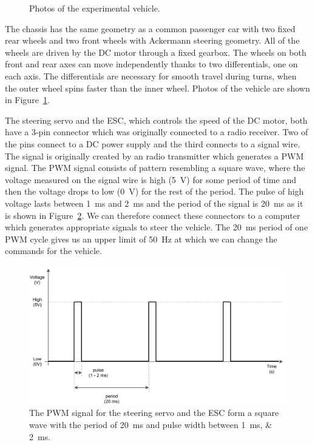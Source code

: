 \begin{figure}[!tbp]
	\label{fig:chassis}
	\caption{Photos of the experimental vehicle.}
\end{figure}

The chassis has the same geometry as a common passenger car with two fixed rear wheels and two front wheels with Ackermann steering geometry. All of the wheels are driven by the \gls*{DC} motor through a fixed gearbox. The wheels on both front and rear axes can move independently thanks to two differentials, one on each axis. The differentials are necessary for smooth travel during turns, when the outer wheel spins faster than the inner wheel. Photos of the vehicle are shown in Figure~\ref{fig:chassis}.

The steering servo and the \gls*{ESC}, which controls the speed of the \gls*{DC} motor, both have a 3-pin connector which was originally connected to a radio receiver. Two of the pins connect to a \gls*{DC} power supply and the third connects to a signal wire. The signal is originally created by an radio transmitter which generates a \gls{PWM} signal. The \gls*{PWM} signal consists of pattern resembling a square wave, where the voltage measured on the signal wire is high (\SI{5}{\volt}) for some period of time and then the voltage drops to low (\SI{0}{\volt}) for the rest of the period. The pulse of high voltage lasts between \SI{1}{\milli\second} and \SI{2}{\milli\second} and the period of the signal is \SI{20}{\milli\second} as it is shown in Figure~\ref{fig:pwm}. We can therefore connect these connectors to a computer which generates appropriate signals to steer the vehicle. The \SI{20}{\milli\second} period of one \gls*{PWM} cycle gives us an upper limit of \SI{50}{\hertz} at which we can change the commands for the vehicle.

\begin{figure}[]\centering
	\includegraphics[width=125mm]{../img/pwm.pdf}
	\caption{The PWM signal for the steering servo and the ESC form a square wave with the period of \SI{20}{\milli\second} and pulse width between \SIlist{1;2}{\milli\second}.}
	\label{fig:pwm}
\end{figure}

